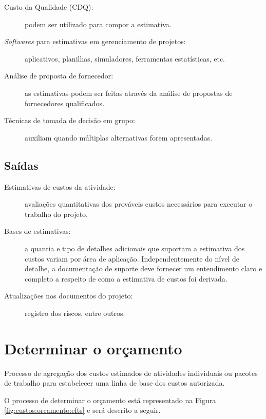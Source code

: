 \begin{description}
	\item[Custo da Qualidade (CDQ):] podem ser utilizado para compor a estimativa.
	
	\item[\textit{Softwares} para estimativas em gerenciamento de projetos:] aplicativos, planilhas, simuladores, ferramentas estatísticas, etc.
	
	\item[Análise de proposta de fornecedor:] as estimativas podem ser feitas através da análise de propostas de fornecedores qualificados.
	
	\item[Técnicas de tomada de decisão em grupo:] auxiliam quando múltiplas alternativas forem apresentadas.
	
		
\end{description}

\section{Saídas}

\begin{description}
	
	\item[Estimativas de custos da atividade:] avaliações quantitativas dos prováveis custos necessários para executar o trabalho do projeto.
	
	\item[Bases de estimativas:] a quantia e tipo de detalhes adicionais que suportam a estimativa dos custos variam por área de aplicação. Independentemente do nível de detalhe, a documentação de suporte deve fornecer um entendimento claro e completo a respeito de como a estimativa de custos foi derivada.

	\item[Atualizações nos documentos do projeto:] registro dos riscos, entre outros.

\end{description}

\chapter{Determinar o orçamento}

Processo de agregação dos custos estimados de atividades individuais ou pacotes de trabalho para estabelecer uma linha de base dos custos autorizada. 

O processo de determinar o orçamento está representado na Figura \ref{fig:custos:orcamento:efts} e será descrito a seguir.

